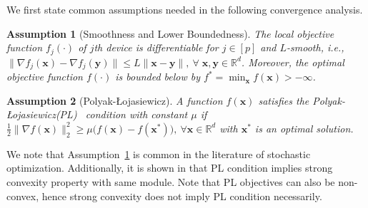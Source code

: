 \documentclass[twoside]{article}
\newcommand{\pl}{Polyak-\L{}ojasiewicz}
\newtheorem{assumption}{Assumption}
\begin{document}
We first state common assumptions needed in the following convergence analysis.
\begin{assumption}[Smoothness and Lower Boundedness]\label{Assu:1}
The local objective function $f_j(\cdot)$ of $j$th device is differentiable for $j\in [p]$ and $L$-smooth, i.e., $\|\nabla f_j(\boldsymbol{x})-\nabla f_j(\mathbf{y})\|\leq L\|\boldsymbol{x}-\mathbf{y}\|,\: \forall \;\boldsymbol{x},\mathbf{y}\in\mathbb{R}^d$. Moreover, the optimal objective function $f(\cdot)$ is bounded below by ${f^*} = \min_{\boldsymbol{x}} f(\boldsymbol{x})>-\infty$. 
\end{assumption}
\begin{assumption}[\pl]\label{assum:pl}
A function $f(\boldsymbol{x})$ satisfies the \pl (PL)~ condition with constant $\mu$ if $\frac{1}{2}\|\nabla f(\boldsymbol{x})\|_2^2\geq \mu\big(f(\boldsymbol{x})-f(\boldsymbol{x}^*)\big),\: \forall \boldsymbol{x}\in\mathbb{R}^d $ with $\boldsymbol{x}^*$ is an optimal solution.
\end{assumption}
We note that Assumption~\ref{Assu:1} is common in the literature of stochastic optimization. Additionally, it is shown in \cite{karimi2016linear} that PL condition implies strong convexity property with same module. 
Note that PL objectives can also be non-convex, hence strong convexity does not imply PL condition necessarily.  

\vspace{-0.05in}
\end{document}

